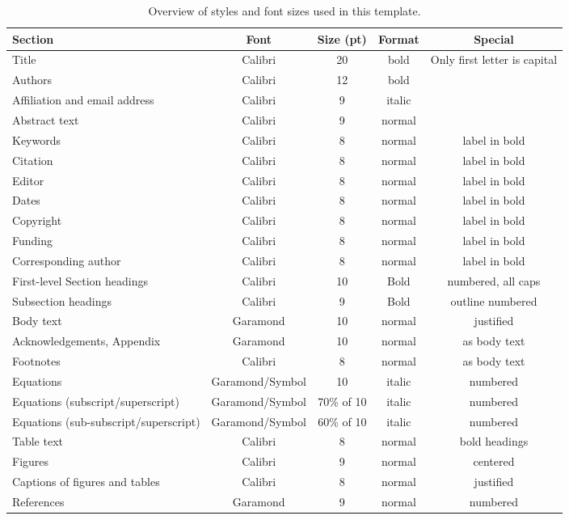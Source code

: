\documentclass[final]{imeko_acta}
\begin{document}
\begin{table*}[t]
	\caption{Overview of styles and font sizes used in this template.}
	\label{tab:tab1}
	\centering
	\renewcommand{\arraystretch}{1.15}\footnotesize
	\begin{tabularx}{\textwidth}{lCCCC}
		\toprule
		\bfseries Section & \bfseries Font & \bfseries Size (pt) & \bfseries Format & \bfseries Special \\
		\midrule
		Title & Calibri & 20 & bold & Only first letter is capital \\
		Authors & Calibri & 12 & bold &  \\
		Affiliation and email address & Calibri & 9 & italic &  \\
		Abstract text & Calibri & 9 & normal &  \\
		Keywords & Calibri & 8 & normal & label in bold \\
		Citation & Calibri & 8 & normal & label in bold \\
		Editor & Calibri & 8 & normal & label in bold \\
		Dates & Calibri & 8 & normal & label in bold \\
		Copyright & Calibri & 8 & normal & label in bold \\
		Funding & Calibri & 8 & normal & label in bold \\
		Corresponding author & Calibri & 8 & normal & label in bold \\
		First-level Section headings  & Calibri & 10 & Bold & numbered, all caps \\
		Subsection headings & Calibri & 9 & Bold & outline numbered \\
		Body text & Garamond & 10 & normal & justified \\
		Acknowledgements, Appendix & Garamond & 10 & normal & as body text \\
		Footnotes  & Calibri & 8 & normal & as body text \\
		Equations & Garamond/Symbol & 10 & italic & numbered \\
		Equations (subscript/superscript) & Garamond/Symbol & 70\% of 10 & italic & numbered \\
		Equations (sub-subscript/superscript) & Garamond/Symbol & 60\% of 10 & italic & numbered \\
		Table text & Calibri & 8 & normal & bold headings \\
		Figures & Calibri & 9 & normal & centered \\
		Captions of figures and tables & Calibri & 8 & normal & justified \\
		References & Garamond & 9 & normal & numbered \\
		\bottomrule
	\end{tabularx}
\end{table*}
\end{document}

